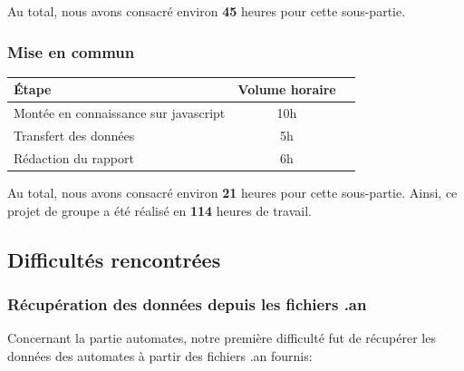 Au total, nous avons consacré environ \textbf{45} heures pour cette sous-partie. 
  
\subsubsection{Mise en commun}

\begin{flushleft}
\begin{tabular}{|l|c|r|}
  \hline
   Étape & Volume horaire \\
  \hline
  Montée en connaissance sur javascript & 10h \\
  \hline
  Transfert des données & 5h \\
    \hline
 Rédaction du rapport & 6h \\
 \hline
    
 \end{tabular}
 \end{flushleft}

Au total, nous avons consacré environ \textbf{21} heures pour cette sous-partie.
\bigbreak
Ainsi, ce projet de groupe a été réalisé en \textbf{114} heures de travail. 
  
  
\bigbreak
\bigbreak
\subsection{Difficultés rencontrées}
\bigbreak

\subsubsection{Récupération des données depuis les fichiers .an}
Concernant la partie automates, notre première difficulté fut de récupérer les données des automates à partir des fichiers .an fournis:

